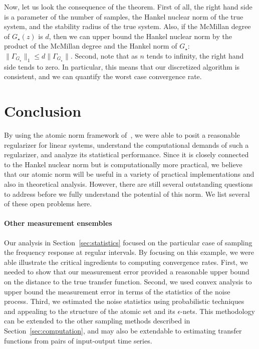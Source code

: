 \noindent Now, let us look the consequence of the theorem. First of all, the
right hand side is a parameter of the number of samples, the Hankel nuclear norm
of the true system, and the stability radius of the true system. Also, if the
McMillan degree of $G_\star(z)$ is $d$, then we can upper bound the Hankel
nuclear norm by the product of the McMillan degree and the Hankel norm of
$G_\star$: $\|\Gamma_{G_\star}\|_1 \leq d \|\Gamma_{G_\star}\|$. Second, note
that as $n$ tends to infinity, the right hand side tends to zero. In particular,
this means that our discretized algorithm is consistent, and we can quantify the
worst case convergence rate.

\section{Conclusion}\label{sec:conclusion}

By using the atomic norm framework of~\cite{crpw}, we were able to posit a
reasonable regularizer for linear systems, understand the computational demands
of such a regularizer, and analyze its statistical performance. Since it is
closely connected to the Hankel nuclear norm but is computationally more
practical, we believe that our atomic norm will be useful in a variety of
practical implementations and also in theoretical analysis. However, there are
still several outstanding questions to address before we fully understand the
potential of this norm. We list several of these open problems here.

\paragraph{Other measurement ensembles} Our analysis in
Section~\ref{sec:statistics} focused on the particular case of sampling the
frequency response at regular intervals. By focusing on this example, we were
able illustrate the critical ingredients to computing convergence rates. First,
we needed to show that our measurement error provided a reasonable upper bound
on the distance to the true transfer function. Second, we used convex analysis
to upper bound the measurement error in terms of the statistics of the noise
process. Third, we estimated the noise statistics using probabilistic techniques
and appealing to the structure of the atomic set and its $\epsilon$-nets. This
methodology can be extended to the other sampling methods described in
Section~\ref{sec:computation}, and may also be extendable to estimating transfer
functions from pairs of input-output time series.

